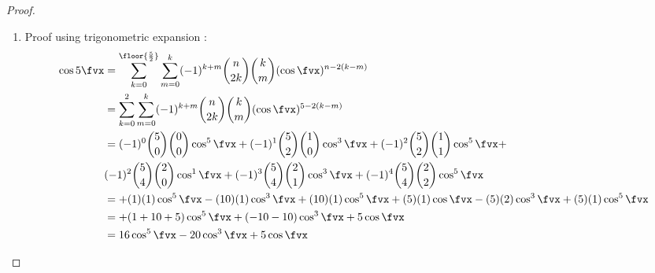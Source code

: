 \begin{proof}
\begin{enumerate}
\begin{align*}
       +   5 \cos\fvx (1-2\cos^2\fvx+\cos^4\fvx)
       \right] +
       \\&
         i\left[ 
         5 (1-2\sin^2\fvx+\sin^4\fvx)\sin\fvx 
       - 10 (\sin^3\fvx-\sin^5\fvx) 
       +    \sin^5\fvx 
       \right]
  \\&=  \left[
             \cos^5\fvx 
       -  10 (\cos^3\fvx -\cos^5\fvx)
       +   5 (\cos\fvx -2\cos^3\fvx+\cos^5\fvx)
       \right] +
       \\&
         i\left[ 
         5 (\sin\fvx-2\sin^3\fvx+\sin^5\fvx) 
       - 10 (\sin^3\fvx-\sin^5\fvx) 
       +    \sin^5\fvx 
       \right]
  \\&=  \mcom{\left[16\cos^5\fvx -20\cos^3\fvx + 5\cos\fvx \right]}
             {$\cos5\fvx$}
        + 
        i\mcom{\left[16\sin^5\fvx -20\sin^3\fvx + 5 \sin\fvx \right]}
              {$\sin5\fvx$}
\end{align*}

\item Proof using trigonometric expansion :
\begin{align*}
  \cos5\fvx
    &=  \sum_{k=0}^\floor{\frac{5}{2}}\sum_{m=0}^k      
          (-1)^{k+m}\binom{n}{2k}\binom{k}{m} (\cos\fvx)^{n-2(k-m)}
  \\&=  \sum_{k=0}^2 \sum_{m=0}^k      
          (-1)^{k+m}\binom{n}{2k}\binom{k}{m} (\cos\fvx)^{5-2(k-m)}
  \\&=  (-1)^0\binom{5}{0}\binom{0}{0}\cos^5\fvx +
        (-1)^1\binom{5}{2}\binom{1}{0}\cos^3\fvx +
        (-1)^2\binom{5}{2}\binom{1}{1}\cos^5\fvx + 
  \\& 
        (-1)^2\binom{5}{4}\binom{2}{0}\cos^1\fvx +
        (-1)^3\binom{5}{4}\binom{2}{1}\cos^3\fvx +
        (-1)^4\binom{5}{4}\binom{2}{2}\cos^5\fvx
  \\&=  + ( 1)(1)\cos^5\fvx 
        - (10)(1)\cos^3\fvx 
        + (10)(1)\cos^5\fvx 
        + ( 5)(1)\cos\fvx 
        - ( 5)(2)\cos^3\fvx 
        + ( 5)(1)\cos^5\fvx
  \\&=  + (1+10+5)\cos^5\fvx 
        + (-10-10)\cos^3\fvx 
        + 5\cos\fvx 
  \\&=  16\cos^5\fvx -20\cos^3\fvx + 5\cos\fvx 
\end{align*}
\end{enumerate}
\end{proof}


